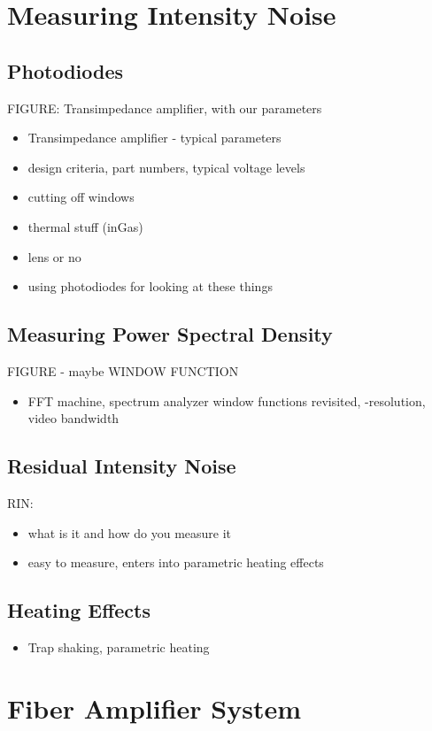 \documentclass[twocolumn,aps,pra,showpacs,preprintnumbers,bibnotes]{revtex4-1}
\begin{document}
\section{Measuring Intensity Noise}
\subsection{Photodiodes}
FIGURE: Transimpedance amplifier, with our parameters
\begin{itemize}
	\item Transimpedance amplifier - typical parameters
	\item design criteria, part numbers, typical voltage levels
	\item cutting off windows
	\item thermal stuff (inGas)
	\item lens or no
	\item using photodiodes for looking at these things
\end{itemize}

\subsection{Measuring Power Spectral Density}
FIGURE - maybe WINDOW FUNCTION
\begin{itemize}
\item FFT machine, spectrum analyzer 
window functions revisited, 
-resolution, video bandwidth
\end{itemize}

\subsection{Residual Intensity Noise}
RIN:
\begin{itemize}
\item what is it and how do you measure it
\item easy to measure, enters into parametric heating effects
\end{itemize}

\subsection{Heating Effects}
\begin{itemize}
	\item Trap shaking, parametric heating
\end{itemize}


\section{Fiber Amplifier System}
\end{document}
